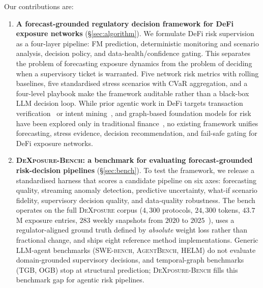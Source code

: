 Our contributions are:
\begin{enumerate}[leftmargin=*, itemsep=2pt]
    \item \textbf{A forecast-grounded regulatory decision framework for DeFi exposure networks} (\S\ref{sec:algorithm}). We formulate DeFi risk supervision as a four-layer pipeline: FM prediction, deterministic monitoring and scenario analysis, decision policy, and data-health/confidence gating. This separates the problem of forecasting exposure dynamics from the problem of deciding when a supervisory ticket is warranted. Five network risk metrics with rolling baselines, five standardised stress scenarios with CVaR aggregation, and a four-level playbook make the framework auditable rather than a black-box LLM decision loop. While prior agentic work in DeFi targets transaction verification~\cite{yao2025arbiter} or intent mining~\cite{mao2025knowyourintent}, and graph-based foundation models for risk have been explored only in traditional finance~\cite{li2025hgmae}, no existing framework unifies forecasting, stress evidence, decision recommendation, and fail-safe gating for DeFi exposure networks.

    \item \textbf{\textsc{DeXposure-Bench}: a benchmark for evaluating forecast-grounded risk-decision pipelines} (\S\ref{sec:bench}). To test the framework, we release a standardised harness that scores a candidate pipeline on six axes: forecasting quality, streaming anomaly detection, predictive uncertainty, what-if scenario fidelity, supervisory decision quality, and data-quality robustness. The bench operates on the full \textsc{DeXposure} corpus ($4{,}300$ protocols, $24{,}300$ tokens, $43.7$M exposure entries, $283$ weekly snapshots from $2020$ to $2025$~\cite{wu2025dexposuredatasetbenchmarksinterprotocol}), uses a regulator-aligned ground truth defined by \emph{absolute} weight loss rather than fractional change, and ships eight reference method implementations. Generic LLM-agent benchmarks (\textsc{SWE-bench}, \textsc{AgentBench}, \textsc{HELM}) do not evaluate domain-grounded supervisory decisions, and temporal-graph benchmarks (\textsc{TGB}, \textsc{OGB}) stop at structural prediction; \textsc{DeXposure-Bench} fills this benchmark gap for agentic risk pipelines.


\end{enumerate}
